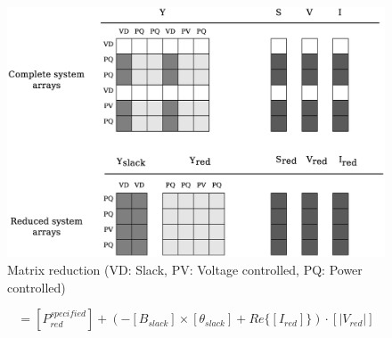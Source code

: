 \documentclass[nols,a4paper,twoside,notoc,fleqn]{tufte-book}
\begin{document}
\begin{figure}[h!]
	\centering
	\includegraphics[width=0.85\linewidth]{img/Matrix_reduction.eps}
	\caption{Matrix reduction (VD: Slack, PV: Voltage controlled, PQ: Power controlled)}
	\label{fig:Matrix_reduction}
\end{figure}

%
%
%
%
%
%
%
%
%

\begin{equation}
[P_{red}] = \left[P^{specified}_{red}\right] + \left(- [{B}_{slack}] \times [{\theta}_{slack}] + Re \{ [I_{red}] \}  \right) \cdot [|{V}_{red}|]
\label{dc_power_injections}
\end{equation}

\end{document}
